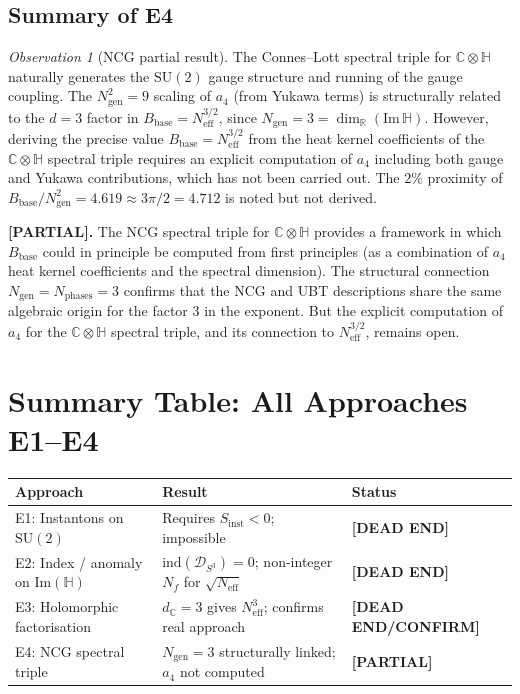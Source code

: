 \documentclass[11pt,a4paper]{article}
\theoremstyle{definition}
\theoremstyle{remark}
\newtheorem{observation}{Observation}
\begin{document}
\subsection{Summary of E4}

\begin{observation}[NCG partial result]
  The Connes--Lott spectral triple for $\mathbb{C}\otimes\mathbb{H}$ naturally
  generates the $\mathrm{SU}(2)$ gauge structure and running of the gauge
  coupling.
  The $N_{\mathrm{gen}}^2 = 9$ scaling of $a_4$ (from Yukawa terms) is
  structurally related to the $d = 3$ factor in $B_{\mathrm{base}} = N_{\mathrm{eff}}^{3/2}$,
  since $N_{\mathrm{gen}} = 3 = \dim_\mathbb{R}(\mathrm{Im}\,\mathbb{H})$.
  However, deriving the precise value $B_{\mathrm{base}} = N_{\mathrm{eff}}^{3/2}$
  from the heat kernel coefficients of the $\mathbb{C}\otimes\mathbb{H}$ spectral
  triple requires an explicit computation of $a_4$ including both gauge and Yukawa
  contributions, which has not been carried out.
  The $2\%$ proximity of $B_{\mathrm{base}}/N_{\mathrm{gen}}^2 = 4.619 \approx 3\pi/2 = 4.712$
  is noted but not derived.
\end{observation}

\textbf{[PARTIAL].}
The NCG spectral triple for $\mathbb{C}\otimes\mathbb{H}$ provides a framework
in which $B_{\mathrm{base}}$ could in principle be computed from first principles
(as a combination of $a_4$ heat kernel coefficients and the spectral dimension).
The structural connection $N_{\mathrm{gen}} = N_{\mathrm{phases}} = 3$ confirms that
the NCG and UBT descriptions share the same algebraic origin for the factor 3
in the exponent.
But the explicit computation of $a_4$ for the $\mathbb{C}\otimes\mathbb{H}$
spectral triple, and its connection to $N_{\mathrm{eff}}^{3/2}$, remains open.

\section{Summary Table: All Approaches E1--E4}
\label{sec:summary}

\begin{center}
\begin{tabular}{lll}
  \toprule
  Approach & Result & Status \\
  \midrule
  E1: Instantons on $\mathrm{SU}(2)$
    & Requires $S_{\mathrm{inst}} < 0$; impossible
    & \textbf{[DEAD END]} \\
  E2: Index / anomaly on $\mathrm{Im}(\mathbb{H})$
    & $\mathrm{ind}(\mathcal{D}_{S^3}) = 0$; non-integer $N_f$ for $\sqrt{N_{\mathrm{eff}}}$
    & \textbf{[DEAD END]} \\
  E3: Holomorphic factorisation
    & $d_\mathbb{C} = 3$ gives $N_{\mathrm{eff}}^3$; confirms real approach
    & \textbf{[DEAD END/CONFIRM]} \\
  E4: NCG spectral triple
    & $N_{\mathrm{gen}} = 3$ structurally linked; $a_4$ not computed
    & \textbf{[PARTIAL]} \\
  \bottomrule
\end{tabular}
\end{center}
\end{document}
